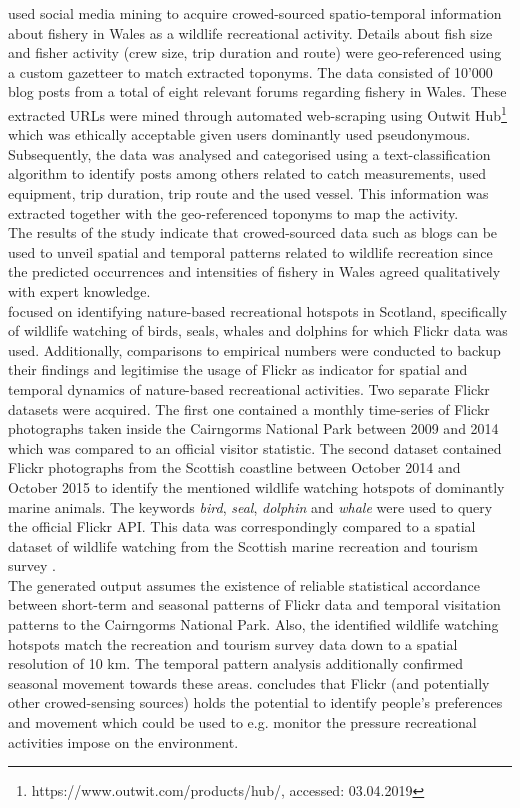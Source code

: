 \textcite{Monkman2018} used social media mining to acquire crowed-sourced spatio-temporal information about fishery in Wales as a wildlife recreational activity. Details about fish size and fisher activity (crew size, trip duration and route) were geo-referenced using a custom gazetteer to match extracted toponyms. The data consisted of 10'000 blog posts from a total of eight relevant forums regarding fishery in Wales. These extracted URLs were mined through automated web-scraping using Outwit Hub\footnote{https://www.outwit.com/products/hub/, accessed: 03.04.2019} which was ethically acceptable given users dominantly used pseudonymous. Subsequently, the data was analysed and categorised using a text-classification algorithm to identify posts among others related to catch measurements, used equipment, trip duration, trip route and the used vessel. This information was extracted together with the geo-referenced toponyms to map the activity. \\
The results of the study indicate that crowed-sourced data such as blogs can be used to unveil spatial and temporal patterns related to wildlife recreation since the predicted occurrences and intensities of fishery in Wales agreed qualitatively with expert knowledge. \\

\textcite{Mancini2018} focused on identifying nature-based recreational hotspots in Scotland, specifically of wildlife watching of birds, seals, whales and dolphins for which Flickr data was used. Additionally, comparisons to empirical numbers were conducted to backup their findings and legitimise the usage of Flickr as indicator for spatial and temporal dynamics of nature-based recreational activities.
Two separate Flickr datasets were acquired. The first one contained a monthly time-series of Flickr photographs taken inside the Cairngorms National Park between 2009 and 2014 which was compared to an official visitor statistic. The second dataset contained Flickr photographs from the Scottish coastline between October 2014 and October 2015 to identify the mentioned wildlife watching hotspots of dominantly marine animals. The keywords \textit{bird}, \textit{seal}, \textit{dolphin} and \textit{whale} were used to query the official Flickr API. This data was correspondingly compared to a spatial dataset of wildlife watching from the Scottish marine recreation and tourism survey \parencite{LUC2016}. \\
The generated output assumes the existence of reliable statistical accordance between short-term and seasonal patterns of Flickr data and temporal visitation patterns to the Cairngorms National Park.  
Also, the identified wildlife watching hotspots match the recreation and tourism survey data down to a spatial resolution of 10 km. The temporal pattern analysis additionally confirmed seasonal movement towards these areas. \textcite{Mancini2018} concludes that Flickr (and potentially other crowed-sensing sources) holds the potential to identify people's preferences and movement which could be used to e.g. monitor the pressure recreational activities impose on the environment.

